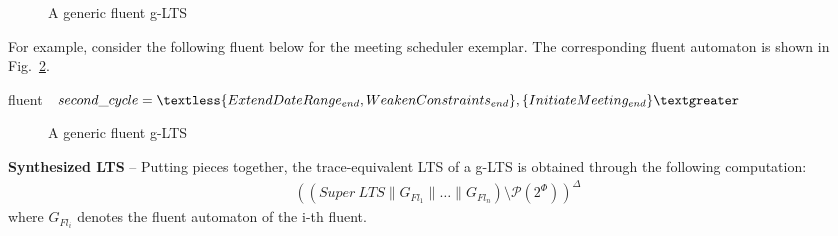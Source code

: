 \begin{figure}[H]\centering
{}
\caption{A generic fluent g-LTS\label{image:fluent-glts}}
\end{figure}

For example, consider the following fluent below for the meeting scheduler exemplar. The corresponding fluent automaton is shown in Fig.~\ref{image:second-cycle-fluent-glts}.
\begin{center}
fluent $second\_cycle = \textless \{ ExtendDateRange_{end}, \newline WeakenConstraints_{end} \},
 \{ InitiateMeeting_{end} \} \textgreater $\\
\end{center}

\begin{figure}[H]\centering
{}
\caption{A generic fluent g-LTS\label{image:second-cycle-fluent-glts}}
\end{figure}

\noindent \textbf{Synthesized LTS} -- Putting pieces together, the trace-equivalent LTS of a g-LTS is obtained through the following computation:
\begin{align*}
\left((Super~LTS \parallel G_{Fl_1} \parallel \ldots \parallel G_{Fl_n}) \setminus \mathcal{P}(2^\Phi)\right)^\Delta
\end{align*}
\noindent where $G_{Fl_i}$ denotes the fluent automaton of the i-th fluent.

